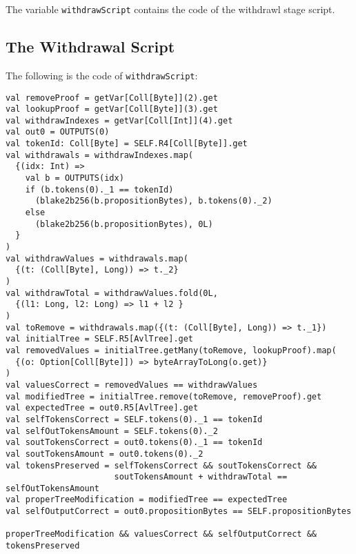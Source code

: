 \documentclass[runningheads]{llncs}
\begin{document}
The variable \texttt{withdrawScript} contains the code of the withdrawl stage script.
\subsection{The Withdrawal Script}
\label{ico-withdrawal}

The following is the code of \texttt{withdrawScript}:
\small{
\begin{verbatim}
val removeProof = getVar[Coll[Byte]](2).get
val lookupProof = getVar[Coll[Byte]](3).get
val withdrawIndexes = getVar[Coll[Int]](4).get
val out0 = OUTPUTS(0)
val tokenId: Coll[Byte] = SELF.R4[Coll[Byte]].get
val withdrawals = withdrawIndexes.map(
  {(idx: Int) =>
    val b = OUTPUTS(idx)
    if (b.tokens(0)._1 == tokenId) 
      (blake2b256(b.propositionBytes), b.tokens(0)._2)
    else 
      (blake2b256(b.propositionBytes), 0L)
  }
)
val withdrawValues = withdrawals.map(
  {(t: (Coll[Byte], Long)) => t._2}
)
val withdrawTotal = withdrawValues.fold(0L, 
  {(l1: Long, l2: Long) => l1 + l2 }
)
val toRemove = withdrawals.map({(t: (Coll[Byte], Long)) => t._1})
val initialTree = SELF.R5[AvlTree].get
val removedValues = initialTree.getMany(toRemove, lookupProof).map(
  {(o: Option[Coll[Byte]]) => byteArrayToLong(o.get)}
)
val valuesCorrect = removedValues == withdrawValues
val modifiedTree = initialTree.remove(toRemove, removeProof).get
val expectedTree = out0.R5[AvlTree].get
val selfTokensCorrect = SELF.tokens(0)._1 == tokenId
val selfOutTokensAmount = SELF.tokens(0)._2
val soutTokensCorrect = out0.tokens(0)._1 == tokenId
val soutTokensAmount = out0.tokens(0)._2
val tokensPreserved = selfTokensCorrect && soutTokensCorrect && 
                      soutTokensAmount + withdrawTotal == selfOutTokensAmount
val properTreeModification = modifiedTree == expectedTree
val selfOutputCorrect = out0.propositionBytes == SELF.propositionBytes

properTreeModification && valuesCorrect && selfOutputCorrect && tokensPreserved
\end{verbatim}
}
\end{document}
